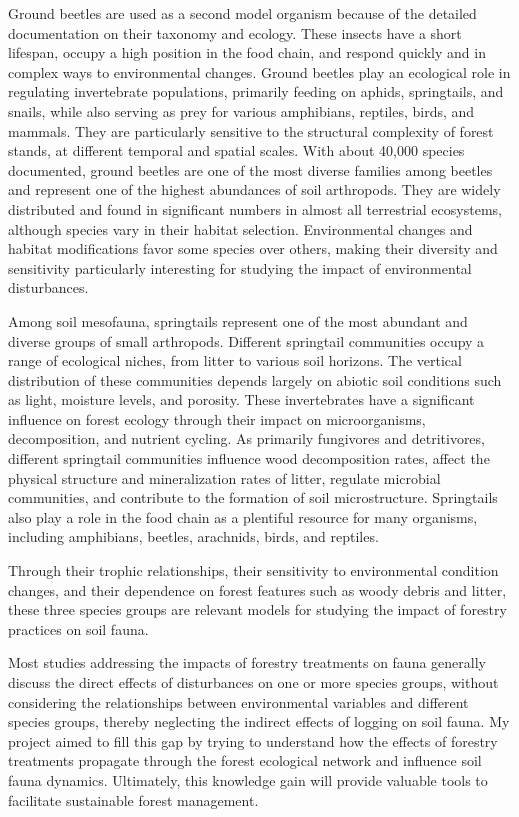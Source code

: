 Ground beetles are used as a second model organism because of the detailed documentation on their taxonomy and ecology. 
These insects have a short lifespan, occupy a high position in the food chain, and respond quickly and in complex ways to environmental changes. 
Ground beetles play an ecological role in regulating invertebrate populations, primarily feeding on aphids, springtails, and snails, while also serving as prey for various amphibians, reptiles, birds, and mammals. 
They are particularly sensitive to the structural complexity of forest stands, at different temporal and spatial scales. 
With about 40,000 species documented, ground beetles are one of the most diverse families among beetles and represent one of the highest abundances of soil arthropods. 
They are widely distributed and found in significant numbers in almost all terrestrial ecosystems, although species vary in their habitat selection. 
Environmental changes and habitat modifications favor some species over others, making their diversity and sensitivity particularly interesting for studying the impact of environmental disturbances.


Among soil mesofauna, springtails represent one of the most abundant and diverse groups of small arthropods. 
Different springtail communities occupy a range of ecological niches, from litter to various soil horizons. 
The vertical distribution of these communities depends largely on abiotic soil conditions such as light, moisture levels, and porosity. 
These invertebrates have a significant influence on forest ecology through their impact on microorganisms, decomposition, and nutrient cycling. 
As primarily fungivores and detritivores, different springtail communities influence wood decomposition rates, affect the physical structure and mineralization rates of litter, 
regulate microbial communities, and contribute to the formation of soil microstructure. Springtails also play a role in the food chain as a plentiful resource for many organisms, 
including amphibians, beetles, arachnids, birds, and reptiles.

%

Through their trophic relationships, their sensitivity to environmental condition changes, and their dependence on forest features such as woody debris and litter, 
these three species groups are relevant models for studying the impact of forestry practices on soil fauna.

Most studies addressing the impacts of forestry treatments on fauna generally discuss the direct effects of disturbances on one or more species groups, 
without considering the relationships between environmental variables and different species groups, thereby neglecting the indirect effects of logging on soil fauna. 
My project aimed to fill this gap by trying to understand how the effects of forestry treatments propagate through the forest ecological network and influence soil fauna dynamics. 
Ultimately, this knowledge gain will provide valuable tools to facilitate sustainable forest management.

